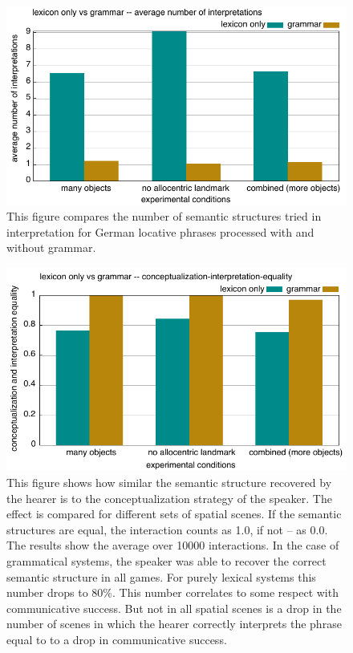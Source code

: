 \begin{figure}
\begin{center}
\includegraphics[width=0.9\columnwidth]{figs/why-grammar-german-avg-interpretations}
\end{center}
\caption[Comparison average number of interpretations]{%
This figure compares the number of semantic 
structures tried in interpretation for German locative 
phrases processed 
with and without grammar.}
\label{f:why-grammar-german-interpretation-1}
\end{figure}

\begin{figure}
\begin{center}
\includegraphics[width=1.0\columnwidth]{figs/why-grammar-conceptualization-interpretation-equality}
\caption[Comparison interpretation equality]{%
This figure shows how similar the semantic structure 
recovered by the hearer is to the conceptualization strategy of 
the speaker. The effect is compared for different sets of spatial scenes. 
If the semantic structures are equal, the interaction counts as 1.0, if 
not -- as 0.0. The results show the average over 10000 interactions. 
In the case of grammatical systems, the speaker was able to recover the correct semantic structure
in all games. For purely lexical systems this number drops to 80\%. This number correlates
to some respect with communicative success. But not in all spatial scenes is a drop 
in the number of scenes in which the hearer correctly interprets the phrase equal to
to a drop in communicative success.}
\label{f:why-grammar-german-interpretation-2}
\end{center}
\end{figure}

